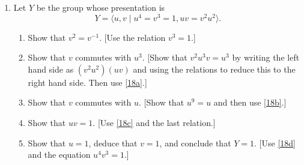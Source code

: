 \begin{enumerate}[resume]
\begin{enumerate}[label = (\alph*)]
  \end{enumerate}
\item
  Let \(Y\) be the group whose presentation is
  \[
  Y = \langle u,v\mid u^4 = v^3 = 1, uv = v^2u^2\rangle.
  \]
  \begin{enumerate}[label = (\alph*), ref = \theenumi (\alph*)]
  \item
    \label{18a}
    Show that \(v^2 = v^{-1}\).
    [Use the relation \(v^3 = 1\).]
  \item
    \label{18b}
    Show that \(v\) commutes with \(u^3\).
    [Show that \(v^2u^3v = u^3\) by writing the left hand side as
    \((v^2u^2)(uv)\) and using the relations to reduce this to the right hand
    side.
    Then use \cref{18a}.]
  \item
    \label{18c}
    Show that \(v\) commutes with \(u\).
    [Show that \(u^9 = u\) and then use \cref{18b}.]
  \item
    \label{18d}
    Show that \(uv = 1\).
    [Use \cref{18c} and the last relation.]
  \item
    Show that \(u = 1\), deduce that \(v = 1\), and conclude that \(Y = 1\).
    [Use \cref{18d} and the equation \(u^4v^3 = 1\).]
  \end{enumerate}
\end{enumerate}
